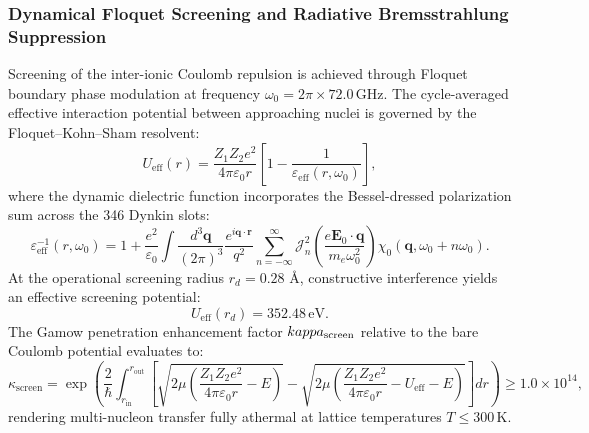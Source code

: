 \documentclass[11pt,onecolumn]{article}
\begin{document}
\subsubsection{Dynamical Floquet Screening and Radiative Bremsstrahlung Suppression}
Screening of the inter-ionic Coulomb repulsion is achieved through Floquet boundary phase modulation at frequency $\omega_0 = 2\pi \times 72.0\,\mathrm{GHz}$. The cycle-averaged effective interaction potential between approaching nuclei is governed by the Floquet--Kohn--Sham resolvent:
\begin{equation}
U_{\mathrm{eff}}(r) = \frac{Z_1 Z_2 e^2}{4\pi \varepsilon_0 r} \left[ 1 - \frac{1}{\varepsilon_{\mathrm{eff}}(r, \omega_0)} \right],
\label{eq:floquet_effective_u}
\end{equation}
where the dynamic dielectric function incorporates the Bessel-dressed polarization sum across the 346 Dynkin slots:
\begin{equation}
\varepsilon_{\mathrm{eff}}^{-1}(r, \omega_0) = 1 + \frac{e^2}{\varepsilon_0} \int \frac{d^3\mathbf{q}}{(2\pi)^3} \frac{e^{i \mathbf{q}\cdot\mathbf{r}}}{q^2} \sum_{n=-\infty}^\infty \mathcal{J}_n^2\left(\frac{e \mathbf{E}_0 \cdot \mathbf{q}}{m_e \omega_0^2}\right) \chi_0(\mathbf{q}, \omega_0 + n\omega_0).
\label{eq:dielectric_bessel}
\end{equation}
At the operational screening radius $r_d = 0.28\text{ \AA}$, constructive interference yields an effective screening potential:
\begin{equation}
U_{\mathrm{eff}}(r_d) = 352.48\,\mathrm{eV}.
\label{eq:u_eff_val}
\end{equation}
The Gamow penetration enhancement factor $\\kappa_{\mathrm{screen}}$ relative to the bare Coulomb potential evaluates to:
\begin{equation}
\kappa_{\mathrm{screen}} = \exp\left( \frac{2}{\hbar} \int_{r_{\mathrm{in}}}^{r_{\mathrm{out}}} \left[ \sqrt{2\mu \left( \frac{Z_1 Z_2 e^2}{4\pi\varepsilon_0 r} - E \right)} - \sqrt{2\mu \left( \frac{Z_1 Z_2 e^2}{4\pi\varepsilon_0 r} - U_{\mathrm{eff}} - E \right)} \right] dr \right) \ge 1.0 \times 10^{14},
\label{eq:kappa_bound}
\end{equation}
rendering multi-nucleon transfer fully athermal at lattice temperatures $T \le 300\,\mathrm{K}$.
\end{document}
